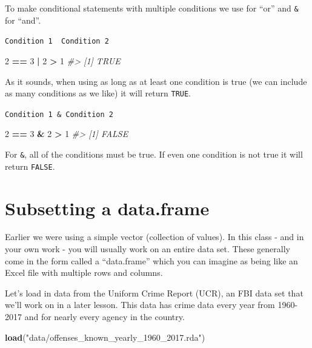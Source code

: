 \documentclass[
  12pt,
]{book}
\newenvironment{Shaded}{\begin{snugshade}}{\end{snugshade}}
\newcommand{\CommentTok}[1]{\textcolor[rgb]{0.37,0.37,0.37}{\textit{#1}}}
\newcommand{\DecValTok}[1]{\textcolor[rgb]{0.06,0.06,0.06}{#1}}
\newcommand{\KeywordTok}[1]{\textcolor[rgb]{0.27,0.27,0.27}{\textbf{#1}}}
\newcommand{\NormalTok}[1]{#1}
\newcommand{\OperatorTok}[1]{\textcolor[rgb]{0.43,0.43,0.43}{\textbf{#1}}}
\newcommand{\StringTok}[1]{\textcolor[rgb]{0.5,0.5,0.5}{#1}}
\begin{document}
To make conditional statements with multiple conditions we use \texttt{\textbar{}} for ``or'' and \texttt{\&} for ``and''.

\texttt{Condition\ 1\ \textbar{}\ Condition\ 2}

\begin{Shaded}
\begin{Highlighting}[]
\DecValTok{2} \OperatorTok{==}\StringTok{ }\DecValTok{3} \OperatorTok{|}\StringTok{ }\DecValTok{2} \OperatorTok{\textgreater{}}\StringTok{ }\DecValTok{1}
\CommentTok{\#\textgreater{} [1] TRUE}
\end{Highlighting}
\end{Shaded}

As it sounds, when using \texttt{\textbar{}} as long as at least one condition is true (we can include as many conditions as we like) it will return \texttt{TRUE}.

\texttt{Condition\ 1\ \&\ Condition\ 2}

\begin{Shaded}
\begin{Highlighting}[]
\DecValTok{2} \OperatorTok{==}\StringTok{ }\DecValTok{3} \OperatorTok{\&}\StringTok{ }\DecValTok{2} \OperatorTok{\textgreater{}}\StringTok{ }\DecValTok{1}
\CommentTok{\#\textgreater{} [1] FALSE}
\end{Highlighting}
\end{Shaded}

For \texttt{\&}, all of the conditions must be true. If even one condition is not true it will return \texttt{FALSE}.

\hypertarget{subsetting-a-data.frame}{%
\section{Subsetting a data.frame}\label{subsetting-a-data.frame}}

Earlier we were using a simple vector (collection of values). In this class - and in your own work - you will usually work on an entire data set. These generally come in the form called a ``data.frame'' which you can imagine as being like an Excel file with multiple rows and columns.

Let's load in data from the Uniform Crime Report (UCR), an FBI data set that we'll work on in a later lesson. This data has crime data every year from 1960-2017 and for nearly every agency in the country.

\begin{Shaded}
\begin{Highlighting}[]
\KeywordTok{load}\NormalTok{(}\StringTok{"data/offenses\_known\_yearly\_1960\_2017.rda"}\NormalTok{)}
\end{Highlighting}
\end{Shaded}
\end{document}
